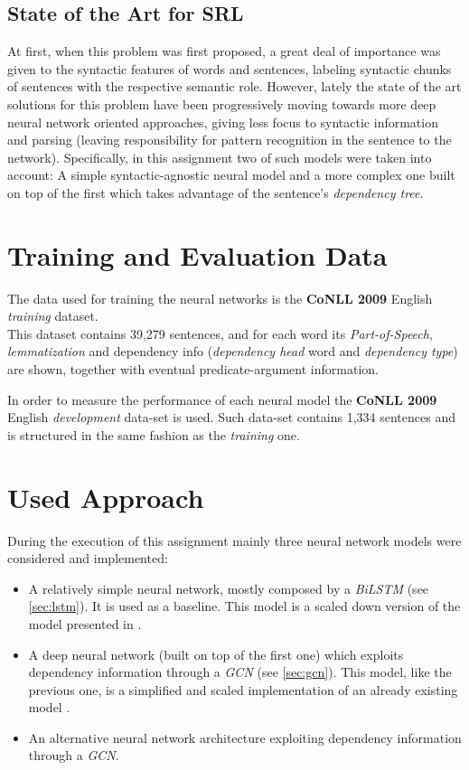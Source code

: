 \documentclass[a4paper,10pt,twocolumn]{article}
\newcommand{\SRL}{\textbf{SRL}}
\newcommand{\BiLSTM}{\emph{BiLSTM}}
\newcommand{\GCN}{\emph{GCN}}
\begin{document}
\subsection{State of the Art for \SRL}
At first, when this problem was first proposed, a great deal of importance was given to the syntactic features of words and sentences, labeling syntactic chunks of sentences with the respective semantic role. However, lately the state of the art solutions for this problem  have been progressively moving towards more deep neural network oriented approaches, giving less focus to syntactic information and parsing (leaving responsibility for pattern recognition in the sentence to the network). Specifically, in this assignment two of such models were taken into account: A simple syntactic-agnostic neural model and a more complex one built on top of the first which takes advantage of the sentence's \emph{dependency tree}.


\section{Training and Evaluation Data}
\label{sec:training_data}
The data used for training the neural networks is the \textbf{CoNLL 2009} English \emph{training} dataset.\\
This dataset contains 39,279 sentences, and for each word its \emph{Part-of-Speech}, \emph{lemmatization} and dependency info (\emph{dependency head} word and \emph{dependency type}) are  shown, together with eventual predicate-argument information. 


In order to measure the performance of each neural model the \textbf{CoNLL 2009} English \emph{development} data-set is used. Such data-set contains 1,334 sentences and is structured in the same fashion as the \emph{training} one.


\section{Used Approach}
During the execution of this assignment mainly three neural network models were  considered and  implemented:
\begin{itemize}
\item A relatively simple neural network, mostly composed by a \BiLSTM{} (see \cref{sec:lstm}). It is used as a baseline. This model is a scaled down version of the model presented in \cite{simple}.
\item A deep neural network (built on top of the first one) which exploits dependency information through a \GCN{} (see \cref{sec:gcn}). This model, like the previous one, is a simplified and scaled implementation of an already existing model \cite{gcn}.
\item An alternative neural network architecture exploiting dependency information through a \GCN{}.
\end{itemize}
\end{document}

